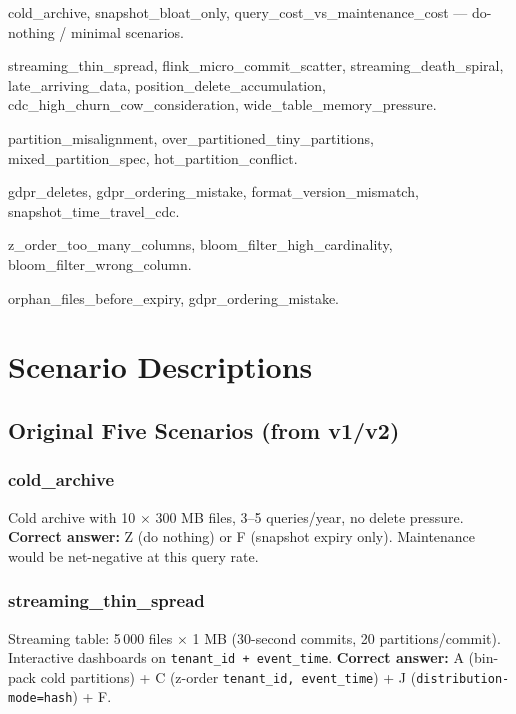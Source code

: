 \documentclass[11pt,a4paper]{article}
\newcommand{\code}[1]{\texttt{#1}}
\begin{document}
\begin{description}[leftmargin=2.5em,labelwidth=2em]
  \item[Basic maintenance]  cold\_archive, snapshot\_bloat\_only,
        query\_cost\_vs\_maintenance\_cost --- do-nothing / minimal scenarios.
  \item[Compaction strategy]  streaming\_thin\_spread, flink\_micro\_commit\_scatter,
        streaming\_death\_spiral, late\_arriving\_data, position\_delete\_accumulation,
        cdc\_high\_churn\_cow\_consideration, wide\_table\_memory\_pressure.
  \item[Partitioning]  partition\_misalignment, over\_partitioned\_tiny\_partitions,
        mixed\_partition\_spec, hot\_partition\_conflict.
  \item[Delete management]  gdpr\_deletes, gdpr\_ordering\_mistake,
        format\_version\_mismatch, snapshot\_time\_travel\_cdc.
  \item[Advanced optimisation]  z\_order\_too\_many\_columns,
        bloom\_filter\_high\_cardinality, bloom\_filter\_wrong\_column.
  \item[Maintenance ordering]  orphan\_files\_before\_expiry, gdpr\_ordering\_mistake.
\end{description}

\section{Scenario Descriptions}
\label{sec:scenarios}

\subsection{Original Five Scenarios (from v1/v2)}

\subsubsection{cold\_archive}
Cold archive with 10 $\times$ 300 MB files, 3--5 queries/year, no delete
pressure.  \textbf{Correct answer:} Z (do nothing) or F (snapshot expiry only).
Maintenance would be net-negative at this query rate.

\subsubsection{streaming\_thin\_spread}
Streaming table: 5\,000 files $\times$ 1 MB (30-second commits, 20
partitions/commit).  Interactive dashboards on \code{tenant\_id + event\_time}.
\textbf{Correct answer:} A (bin-pack cold partitions) + C (z-order
\code{tenant\_id, event\_time}) + J (\code{distribution-mode=hash}) + F.
\end{document}

